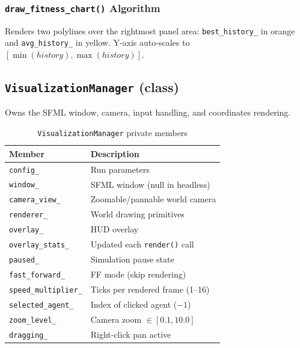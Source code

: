 \subsubsection{\texttt{draw\_fitness\_chart()} Algorithm}

Renders two polylines over the rightmost panel area: \texttt{best\_history\_} in orange
and \texttt{avg\_history\_} in yellow.  Y-axis auto-scales to
$[\min(\mathit{history}), \max(\mathit{history})]$.

\subsection{\texttt{VisualizationManager} (class)}

Owns the SFML window, camera, input handling, and coordinates rendering.

\begin{table}[H]
\centering\small
\caption{\texttt{VisualizationManager} private members}
\begin{tabularx}{\textwidth}{@{}lX@{}}
\toprule
\textbf{Member} & \textbf{Description} \\
\midrule
\texttt{config\_}           & Run parameters \\
\texttt{window\_}           & SFML window (null in headless) \\
\texttt{camera\_view\_}     & Zoomable/pannable world camera \\
\texttt{renderer\_}         & World drawing primitives \\
\texttt{overlay\_}          & HUD overlay \\
\texttt{overlay\_stats\_}   & Updated each \texttt{render()} call \\
\texttt{paused\_}           & Simulation pause state \\
\texttt{fast\_forward\_}    & FF mode (skip rendering) \\
\texttt{speed\_multiplier\_}& Ticks per rendered frame (1–16) \\
\texttt{selected\_agent\_}  & Index of clicked agent ($-1$) \\
\texttt{zoom\_level\_}      & Camera zoom $\in [0.1, 10.0]$ \\
\texttt{dragging\_}         & Right-click pan active \\
\bottomrule
\end{tabularx}
\end{table}

